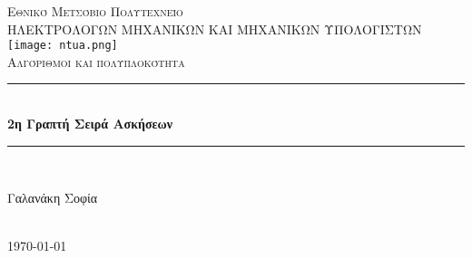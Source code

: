 \documentclass[12pt]{article}
\begin{document}
\begin{titlepage}

\newcommand{\HRule}{\rule{\linewidth}{0.5mm}} 

\center 

\textsc{\LARGE Εθνικό Μετσόβιο Πολυτεχνείο}\\[1.5cm] 
\textsc{\large ΗΛΕΚΤΡΟΛΟΓΩΝ ΜΗΧΑΝΙΚΩΝ ΚΑΙ ΜΗΧΑΝΙΚΩΝ ΥΠΟΛΟΓΙΣΤΩΝ}\\[1.5cm] 
\texttt{[image: ntua.png]}\\[2cm] 
\textsc{\Large Αλγόριθμοι και πολυπλοκότητα}\\[1cm] 
\hfill \break

\HRule \\[0.4cm]
{ \huge \bfseries 2η Γραπτή Σειρά Ασκήσεων }\\[0.4cm] 
\HRule \\[1.5cm]
 
\hfill \break
\begin{minipage}{0.4\textwidth}
\begin{flushleft} \large
\centering  Γαλανάκη Σοφία\\
\end{flushleft}
\hfill \break
\hfill \break
\hfill \break
\hfill \break

\end{minipage}\\[2.5cm]

{\large \today}\\[2cm] 

\vfill 

\end{titlepage}
\end{document}
